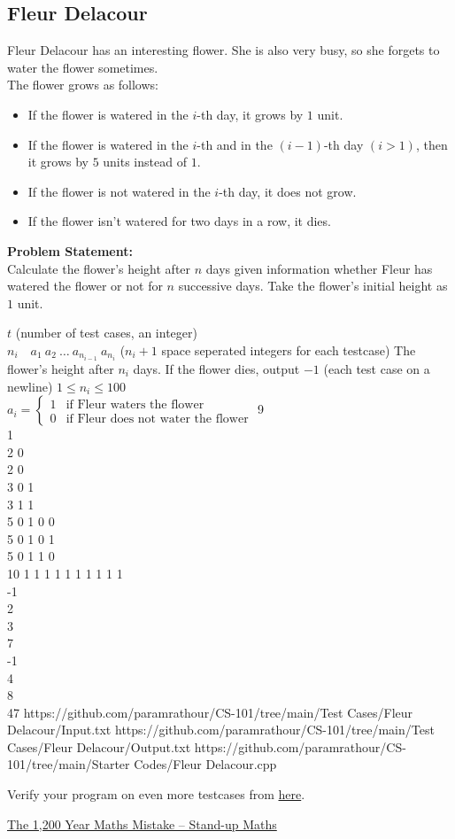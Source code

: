 \documentclass[../../Problems]{subfiles}
\begin{document}
\subsection{Fleur Delacour}
Fleur Delacour has an interesting flower. She is also very busy, so  she forgets to water the flower sometimes.\\
The flower grows as follows:
\vspace{-0.5em}
\begin{itemize}
\item If the flower is watered in the $i$-th day, it grows by $1$ unit.
\item If the flower is watered in the $i$-th and in the $(i-1)$-th day $(i>1)$, then it grows by $5$ units instead of $1$.
\item If the flower is not watered in the $i$-th day, it does not grow.
\item If the flower isn't watered for two days in a row, it dies.
\end{itemize}
\textbf{Problem Statement:}\\
Calculate the flower's height after $n$ days given information whether Fleur has watered the flower or not for $n$ successive days. Take the flower's initial height as $1$ unit.
\vspace{-0.5em}
\begin{testcasesMore}
	{$t$ \hfill(number of test cases, an integer)\\
	$n_i\quad a_{1}\ a_{2}\ \ldots\ a_{n_{i-1}}\ a_{n_i}$ \hfill($n_i+1$ space seperated integers for each testcase)}
	{The flower's height after $n_i$ days. If the flower dies, output $-1$ \hfill(each test case on a newline)}
	{$1 \leq n_i \leq 100$\\[0.5em]
	$
	a_i = \begin{cases} 
      1 & \text{if Fleur waters the flower}\\
      0 & \text{if Fleur does not water the flower}
   \end{cases}
	$}
	{9\\1\\2 0\\2 0\\3 0 1\\3 1 1\\5 0 1 0 0\\5 0 1 0 1\\5 0 1 1 0\\10 1 1 1 1 1 1 1 1 1}
	{1\\-1\\2\\3\\7\\-1\\4\\8\\47}
	{https://github.com/paramrathour/CS-101/tree/main/Test Cases/Fleur Delacour/Input.txt}
	{https://github.com/paramrathour/CS-101/tree/main/Test Cases/Fleur Delacour/Output.txt}
	{https://github.com/paramrathour/CS-101/tree/main/Starter Codes/Fleur Delacour.cpp}
\end{testcasesMore}
\begin{note}
	Verify your program on even more testcases from \href{https://codeforces.com/problemset/problem/1585/A}{here}.
\end{note}
\begin{funvideo}
\href{https://youtu.be/FAdmpAZTH_M}{The 1,200 Year Maths Mistake -- Stand-up Maths}
\end{funvideo}
\end{document}

